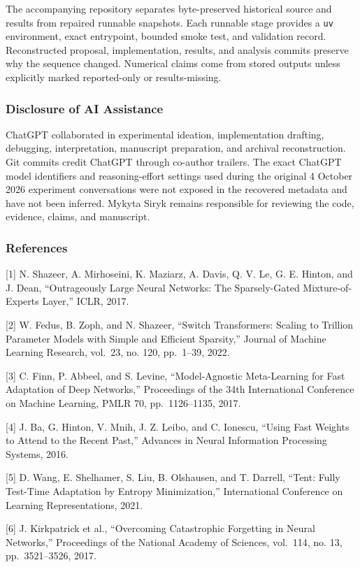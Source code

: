 \documentclass[
  10pt,
]{article}
\begin{document}
The accompanying repository separates byte-preserved historical source
and results from repaired runnable snapshots. Each runnable stage
provides a \texttt{uv} environment, exact entrypoint, bounded smoke
test, and validation record. Reconstructed proposal, implementation,
results, and analysis commits preserve why the sequence changed.
Numerical claims come from stored outputs unless explicitly marked
reported-only or results-missing.

\hypertarget{disclosure-of-ai-assistance}{%
\subsubsection{Disclosure of AI
Assistance}\label{disclosure-of-ai-assistance}}

ChatGPT collaborated in experimental ideation, implementation drafting,
debugging, interpretation, manuscript preparation, and archival
reconstruction. Git commits credit ChatGPT through co-author trailers.
The exact ChatGPT model identifiers and reasoning-effort settings used
during the original 4 October 2026 experiment conversations were not
exposed in the recovered metadata and have not been inferred. Mykyta
Siryk remains responsible for reviewing the code, evidence, claims, and
manuscript.

\hypertarget{references}{%
\subsubsection{References}\label{references}}

{[}1{]} N. Shazeer, A. Mirhoseini, K. Maziarz, A. Davis, Q. V. Le, G. E.
Hinton, and J. Dean, ``Outrageously Large Neural Networks: The
Sparsely-Gated Mixture-of-Experts Layer,'' ICLR, 2017.

{[}2{]} W. Fedus, B. Zoph, and N. Shazeer, ``Switch Transformers:
Scaling to Trillion Parameter Models with Simple and Efficient
Sparsity,'' Journal of Machine Learning Research, vol.~23, no. 120,
pp.~1--39, 2022.

{[}3{]} C. Finn, P. Abbeel, and S. Levine, ``Model-Agnostic
Meta-Learning for Fast Adaptation of Deep Networks,'' Proceedings of the
34th International Conference on Machine Learning, PMLR 70,
pp.~1126--1135, 2017.

{[}4{]} J. Ba, G. Hinton, V. Mnih, J. Z. Leibo, and C. Ionescu, ``Using
Fast Weights to Attend to the Recent Past,'' Advances in Neural
Information Processing Systems, 2016.

{[}5{]} D. Wang, E. Shelhamer, S. Liu, B. Olshausen, and T. Darrell,
``Tent: Fully Test-Time Adaptation by Entropy Minimization,''
International Conference on Learning Representations, 2021.

{[}6{]} J. Kirkpatrick et al., ``Overcoming Catastrophic Forgetting in
Neural Networks,'' Proceedings of the National Academy of Sciences,
vol.~114, no. 13, pp.~3521--3526, 2017.
\end{document}
